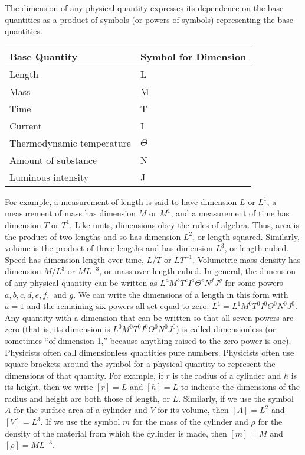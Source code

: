 \documentclass{report}
\begin{document}
    \pagebreak 
    \bigbreak \noindent 
    The dimension of any physical quantity expresses its dependence on the base quantities as a product of symbols (or powers of symbols) representing the base quantities.
    \bigbreak \noindent 
    \begin{center}
        \begin{tabular}{ll}
            \hline
            Base Quantity & Symbol for Dimension \\
            \hline
            Length & L \\
            Mass & M \\
            Time & T \\
            Current & I \\
            Thermodynamic temperature & $\Theta$ \\
            Amount of substance & N \\
            Luminous intensity & J \\
            \hline
        \end{tabular}
    \end{center}
    \bigbreak \noindent 
    For example, a measurement of length is said to have dimension \( L \) or \( L^1 \), a measurement of mass has dimension \( M \) or \( M^1 \), and a measurement of time has dimension \( T \) or \( T^1 \). Like units, dimensions obey the rules of algebra. Thus, area is the product of two lengths and so has dimension \( L^2 \), or length squared. Similarly, volume is the product of three lengths and has dimension \( L^3 \), or length cubed. Speed has dimension length over time, \( L/T \) or \( LT^{-1} \). Volumetric mass density has dimension \( M/L^3 \) or \( ML^{-3} \), or mass over length cubed. In general, the dimension of any physical quantity can be written as \( L^aM^bT^cI^d\Theta^eN^fJ^g \) for some powers \( a, b, c, d, e, f, \) and \( g \). We can write the dimensions of a length in this form with \( a=1 \) and the remaining six powers all set equal to zero: \( L^1 = L^1M^0T^0I^0\Theta^0N^0J^0 \). Any quantity with a dimension that can be written so that all seven powers are zero (that is, its dimension is \( L^0M^0T^0I^0\Theta^0N^0J^0 \)) is called dimensionless (or sometimes “of dimension 1,” because anything raised to the zero power is one). Physicists often call dimensionless quantities pure numbers.
    \bigbreak \noindent 
    Physicists often use square brackets around the symbol for a physical quantity to represent the dimensions of that quantity. For example, if \( r \) is the radius of a cylinder and \( h \) is its height, then we write \([r] = L\) and \([h] = L\) to indicate the dimensions of the radius and height are both those of length, or \( L \). Similarly, if we use the symbol \( A \) for the surface area of a cylinder and \( V \) for its volume, then \([A] = L^2\) and \([V] = L^3\). If we use the symbol \( m \) for the mass of the cylinder and \( \rho \) for the density of the material from which the cylinder is made, then \([m] = M\) and \([\rho] = M L^{-3}\).
\end{document}
